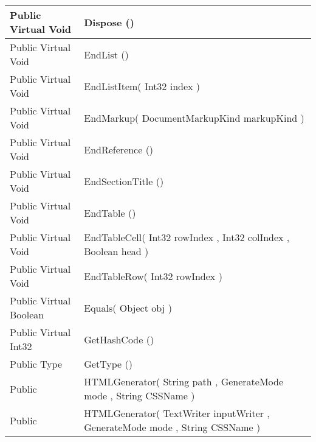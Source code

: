 \documentclass[11pt, oneside, a4paper]{book}
\begin{document}
\begin{center}
\begin{tabular}{| p{3cm} | p{12cm} | }
\hline
 Public  Virtual  Void &  Dispose ()\hypertarget{SoftwareEngineeringTools.{}Documentation.{}HTMLGenerator.{}Dispose}{}\\
\hline
 Public  Virtual  Void &  EndList ()\hypertarget{SoftwareEngineeringTools.{}Documentation.{}HTMLGenerator.{}EndList}{}\\
\hline
 Public  Virtual  Void &  EndListItem(\hypertarget{SoftwareEngineeringTools.{}Documentation.{}HTMLGenerator.{}EndListItem\_Int32}{} Int32  index  )\\
\hline
 Public  Virtual  Void &  EndMarkup(\hypertarget{SoftwareEngineeringTools.{}Documentation.{}HTMLGenerator.{}EndMarkup\_DocumentMarkupKind}{} DocumentMarkupKind  markupKind  )\\
\hline
 Public  Virtual  Void &  EndReference ()\hypertarget{SoftwareEngineeringTools.{}Documentation.{}HTMLGenerator.{}EndReference}{}\\
\hline
 Public  Virtual  Void &  EndSectionTitle ()\hypertarget{SoftwareEngineeringTools.{}Documentation.{}HTMLGenerator.{}EndSectionTitle}{}\\
\hline
 Public  Virtual  Void &  EndTable ()\hypertarget{SoftwareEngineeringTools.{}Documentation.{}HTMLGenerator.{}EndTable}{}\\
\hline
 Public  Virtual  Void &  EndTableCell(\hypertarget{SoftwareEngineeringTools.{}Documentation.{}HTMLGenerator.{}EndTableCell\_Int32\_Int32\_Boolean}{} Int32  rowIndex  ,  Int32  colIndex  ,  Boolean  head  )\\
\hline
 Public  Virtual  Void &  EndTableRow(\hypertarget{SoftwareEngineeringTools.{}Documentation.{}HTMLGenerator.{}EndTableRow\_Int32}{} Int32  rowIndex  )\\
\hline
 Public  Virtual  Boolean &  Equals(\hypertarget{SoftwareEngineeringTools.{}Documentation.{}HTMLGenerator.{}Equals\_Object}{} Object  obj  )\\
\hline
 Public  Virtual  Int32 &  GetHashCode ()\hypertarget{SoftwareEngineeringTools.{}Documentation.{}HTMLGenerator.{}GetHashCode}{}\\
\hline
 Public  Type &  GetType ()\hypertarget{SoftwareEngineeringTools.{}Documentation.{}HTMLGenerator.{}GetType}{}\\
\hline
 Public  &  HTMLGenerator(\hypertarget{SoftwareEngineeringTools.{}Documentation.{}HTMLGenerator.{}HTMLGenerator\_String\_GenerateMode\_String}{} String  path  ,  GenerateMode  mode  ,  String  CSSName  )\\
\hline
 Public  &  HTMLGenerator(\hypertarget{SoftwareEngineeringTools.{}Documentation.{}HTMLGenerator.{}HTMLGenerator\_TextWriter\_GenerateMode\_String}{} TextWriter  inputWriter  ,  GenerateMode  mode  ,  String  CSSName  )\\

\end{tabular}
\end{center}
\end{document}

